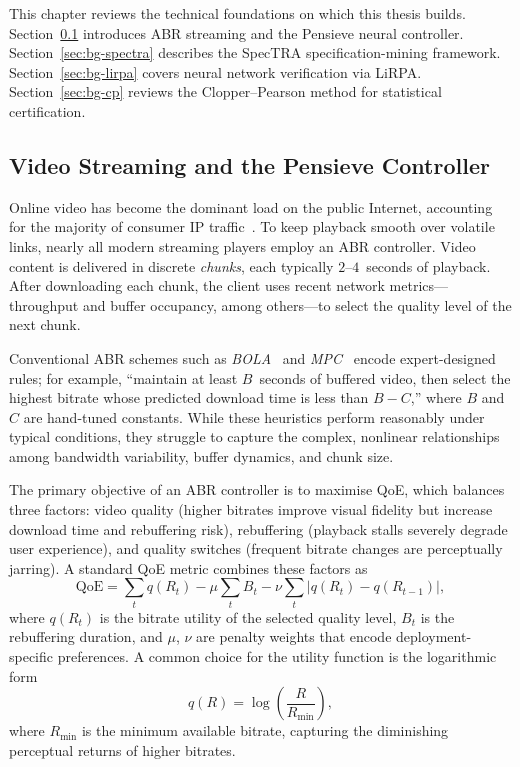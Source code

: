 \documentclass[thesis]{uofithesis} %
\begin{document}
    This chapter reviews the technical foundations on which this thesis
    builds.
    Section~\ref{subsec:streaming} introduces ABR streaming and the
    Pensieve neural controller.
    Section~\ref{sec:bg-spectra} describes the SpecTRA
    specification-mining framework.
    Section~\ref{sec:bg-lirpa} covers neural network verification via
    LiRPA.
    Section~\ref{sec:bg-cp} reviews the Clopper--Pearson method for
    statistical certification.
    
    
    \subsection{Video Streaming and the Pensieve Controller}
    \label{subsec:streaming}
    
    Online video has become the dominant load on the public Internet,
    accounting for the majority of consumer IP
    traffic~\cite{cloudinary-quality}.
    To keep playback smooth over volatile links, nearly all modern streaming
    players employ an ABR controller.
    Video content is delivered in discrete \emph{chunks}, each typically
    $2$--$4$~seconds of playback.
    After downloading each chunk, the client uses recent network
    metrics---throughput and buffer occupancy, among others---to select the
    quality level of the next chunk.
    
    Conventional ABR schemes such as \emph{BOLA}~\cite{bola} and
    \emph{MPC}~\cite{mpc} encode expert-designed rules; for example,
    ``maintain at least $B$~seconds of buffered video, then select the
    highest bitrate whose predicted download time is less than $B - C$,''
    where $B$ and $C$ are hand-tuned constants.
    While these heuristics perform reasonably under typical conditions, they
    struggle to capture the complex, nonlinear relationships among bandwidth
    variability, buffer dynamics, and chunk size.
    
    The primary objective of an ABR controller is to maximise QoE, which
    balances three factors: video quality (higher bitrates improve visual
    fidelity but increase download time and rebuffering risk), rebuffering
    (playback stalls severely degrade user experience), and quality switches
    (frequent bitrate changes are perceptually jarring).
    A standard QoE metric combines these factors as
    \begin{equation}
        \mathrm{QoE}
            = \sum_t q(R_t)
            - \mu \sum_t B_t
            - \nu \sum_t \lvert q(R_t) - q(R_{t-1}) \rvert,
        \label{eq:qoe}
    \end{equation}
    where $q(R_t)$ is the bitrate utility of the selected quality level,
    $B_t$ is the rebuffering duration, and $\mu$, $\nu$ are penalty
    weights that encode deployment-specific preferences.
    A common choice for the utility function is the logarithmic form
    \begin{equation}
        q(R) = \log\!\left(\frac{R}{R_{\min}}\right),
        \label{eq:bg-utility}
    \end{equation}
    where $R_{\min}$ is the minimum available bitrate, capturing the
    diminishing perceptual returns of higher bitrates.
\end{document}
